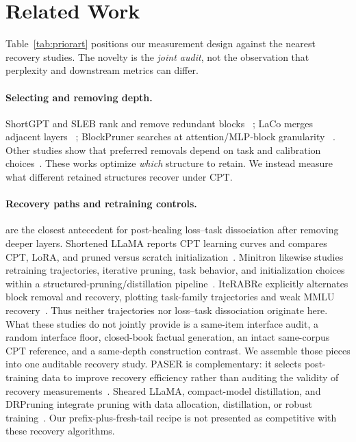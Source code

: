\section{Related Work}
\label{sec:related}

Table~\ref{tab:priorart} positions our measurement design against the nearest
recovery studies. The novelty is the \emph{joint audit}, not the observation
that perplexity and downstream metrics can differ.



\paragraph{Selecting and removing depth.}
ShortGPT and SLEB rank and remove redundant blocks
~\citep{men2024shortgpt,song2024sleb}; LaCo merges adjacent layers
~\citep{yang2024laco}; BlockPruner searches at attention/MLP-block granularity
~\citep{blockpruner}. Other studies show that preferred removals depend on task
and calibration choices~\citep{siddiqui2024deeper,lu2024reassessing,
calibration2026}. These works optimize \emph{which} structure to retain. We
instead measure what different retained structures recover under CPT.

\paragraph{Recovery paths and retraining controls.}
\citet{gromov2024unreasonable} are the closest antecedent for post-healing
loss--task dissociation after removing deeper layers. Shortened LLaMA reports
CPT learning curves and compares CPT, LoRA, and pruned versus scratch
initialization~\citep{shortenedllama}. Minitron likewise studies retraining
trajectories, iterative pruning, task behavior, and initialization choices
within a structured-pruning/distillation pipeline~\citep{minitron}.
IteRABRe explicitly alternates block removal and recovery, plotting task-family
trajectories and weak MMLU recovery~\citep{iterabre}. Thus neither trajectories
nor loss--task dissociation originate here. What these studies do not jointly
provide is a same-item interface audit, a random interface floor, closed-book
factual generation, an intact same-corpus CPT reference, and a same-depth
construction contrast. We assemble those pieces into one auditable recovery
study. PASER is complementary: it selects post-training data to improve
recovery efficiency rather than auditing the validity of recovery
measurements~\citep{paser}.
Sheared LLaMA, compact-model distillation, and DRPruning integrate pruning with
data allocation, distillation, or robust training~\citep{xia2024sheared,
muralidharan2024compact,deng2025drpruning}. Our prefix-plus-fresh-tail recipe is
not presented as competitive with these recovery algorithms.

